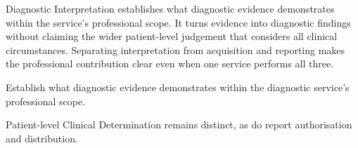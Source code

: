 Diagnostic Interpretation establishes what diagnostic evidence demonstrates within the service's professional scope. It turns evidence into diagnostic findings without claiming the wider patient-level judgement that considers all clinical circumstances. Separating interpretation from acquisition and reporting makes the professional contribution clear even when one service performs all three.



Establish what diagnostic evidence demonstrates within the diagnostic service’s professional scope.



Patient-level Clinical Determination remains distinct, as do report authorisation and distribution.


